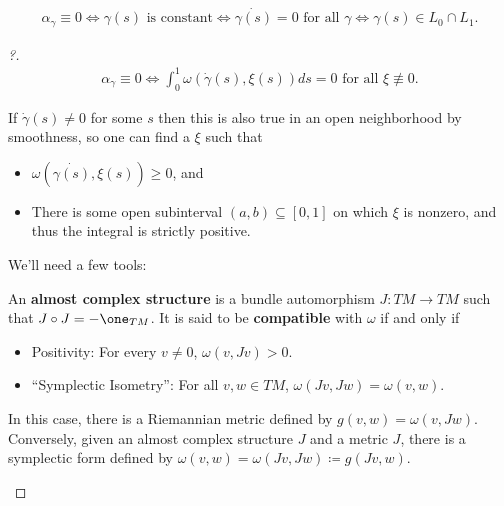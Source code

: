 \begin{lemma}[?]

\begin{align*}
\alpha _{\gamma} \equiv 0 \iff \gamma(s) \text{ is constant} \iff \dot{ \gamma(s)} = 0 \text{ for all } \gamma \iff \gamma(s) \in L_0 \cap L_1
.\end{align*}

\end{lemma}

\begin{proof}[?]

\begin{align*}
\alpha _{\gamma} \equiv 0 \iff \int_0^1 \omega( \dot{\gamma}(s), \xi(s)) ds = 0 \text{ for all } \xi\not\equiv 0
.\end{align*}

\begin{claim}

If \(\dot{\gamma}(s) \neq 0\) for some \(s\) then this is also true in
an open neighborhood by smoothness, so one can find a \(\xi\) such that

\begin{itemize}
\tightlist
\item
  \(\omega( \dot{\gamma(s)}, \xi(s) ) \geq 0\), and
\item
  There is some open subinterval \((a, b) \subseteq [0, 1]\) on which
  \(\xi\) is nonzero, and thus the integral is strictly positive.
\end{itemize}

\end{claim}

We'll need a few tools:

\begin{definition}

An \textbf{almost complex structure} is a bundle automorphism
\(J: TM\to TM\) such that \(J \circ J = - \one_{TM}\). It is said to be
\textbf{compatible} with \(\omega\) if and only if

\begin{itemize}
\tightlist
\item
  Positivity: For every \(v\neq 0\), \(\omega(v, Jv) > 0\).
\item
  ``Symplectic Isometry'': For all \(v, w \in TM\),
  \(\omega(Jv, Jw) = \omega(v, w)\).
\end{itemize}

In this case, there is a Riemannian metric defined by
\(g(v, w) = \omega(v, Jw)\). Conversely, given an almost complex
structure \(J\) and a metric \(J\), there is a symplectic form defined
by \(\omega(v, w) = \omega(Jv, Jw) \coloneqq g(Jv, w)\).


\end{definition}
\end{proof}
